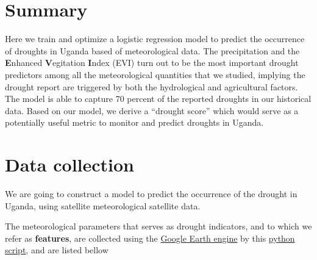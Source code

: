 \documentclass[10pt,parskip=half,
toc=sectionentrywithdots,
bibliography=totocnumbered,
captions=tableheading,numbers=noendperiod]{scrartcl}
\begin{document}
    \begingroup
    \let\cleardoublepage\relax
    \let\clearpage\relax
    \endgroup

\hypertarget{summary}{%
\section{Summary}\label{summary}}

Here we train and optimize a logistic regression model to predict the
occurrence of droughts in Uganda based of meteorological data. The
precipitation and the \textbf{E}nhanced \textbf{V}egitation
\textbf{I}ndex (EVI) turn out to be the most important drought
predictors among all the meteorological quantities that we studied,
implying the drought report are triggered by both the hydrological and
agricultural factors. The model is able to capture 70 percent of the
reported droughts in our historical data. Based on our model, we derive
a ``drought score'' which would serve as a potentially useful metric to
monitor and predict droughts in Uganda.

\hypertarget{data-collection}{%
\section{Data collection}\label{data-collection}}

We are going to construct a model to predict the occurrence of the
drought in Uganda, using satellite meteorological satellite data.

The meteorological parameters that serves as drought indicators, and to
which we refer as \textbf{features}, are collected using the
\href{https://developers.google.com/earth-engine/python_install}{Google
Earth engine} by this
\href{https://github.com/rodekruis/Drought_IBF/blob/master/GoogleEarthEngine/GEE_get_data.py}{python
script}, and are listed bellow
\end{document}
